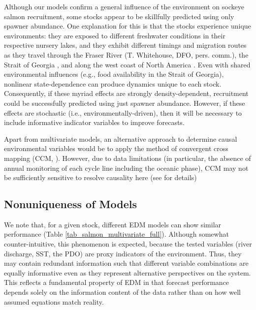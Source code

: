 Although our models confirm a general influence of the environment on sockeye salmon recruitment, some stocks appear to be skillfully predicted using only spawner abundance. One explanation for this is that the stocks experience unique environments: they are exposed to different freshwater conditions in their respective nursery lakes, and they exhibit different timings and migration routes as they travel through the Fraser River (T. Whitehouse, DFO, pers. comm.), the Strait of Georgia \cite{Beacham_2014}, and along the west coast of North America \cite{Tucker_2009}. Even with shared environmental influences (e.g., food availability in the Strait of Georgia), nonlinear state-dependence can produce dynamics unique to each stock. Consequently, if these myriad effects are strongly density-dependent, recruitment could be successfully predicted using just spawner abundance. However, if these effects are stochastic (i.e., environmentally-driven), then it will be necessary to include informative indicator variables to improve forecasts.

Apart from multivariate models, an alternative approach to determine causal environmental variables would be to apply the method of convergent cross mapping (CCM, \cite{Sugihara_2012}). However, due to data limitations (in particular, the absence of annual monitoring of each cycle line including the oceanic phase), CCM may not be sufficiently sensitive to resolve causality here (see  for details)

\subsection{Nonuniqueness of Models}

We note that, for a given stock, different EDM models can show similar performance (Table \ref{tab_salmon_multivariate_full}). Although somewhat counter-intuitive, this phenomenon is expected, because the tested variables (river discharge, SST, the PDO) are proxy indicators of the environment. Thus, they may contain redundant information such that different variable combinations are equally informative even as they represent alternative perspectives on the system. This reflects a fundamental property of EDM in that forecast performance depends solely on the information content of the data rather than on how well assumed equations match reality.

